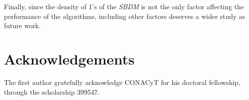 \documentclass[number,preprint,review,12pt]{elsarticle}
\begin{document}
	Finally, since the density of 1's of the \textit{SBDM} is not the only factor affecting the performance of the algorithms, including other factors deserves a wider study as future work. 

\section{Acknowledgements}
	The first author gratefully acknowledge CONACyT for his doctoral fellowship, through the scholarship 399547.
\newpage 
{}

\end{document}
